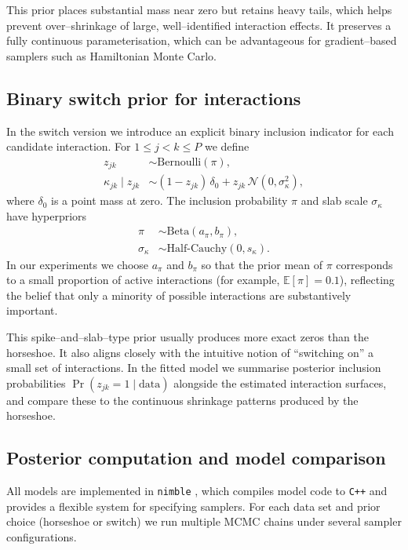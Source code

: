 \documentclass[11pt]{article}
\begin{document}
\begin{doublespacing}
\begin{linenumbers}
\begin{flushleft}
This prior places substantial mass near zero but retains heavy tails, which helps prevent over–shrinkage of large, well–identified interaction effects. It preserves a fully continuous parameterisation, which can be advantageous for gradient–based samplers such as Hamiltonian Monte Carlo.

\subsection{Binary switch prior for interactions}

In the switch version we introduce an explicit binary inclusion indicator for each candidate interaction. For $1 \le j < k \le P$ we define
\begin{align}
  z_{jk} &\sim \mathrm{Bernoulli}(\pi), \\
  \kappa_{jk} \mid z_{jk} &\sim (1-z_{jk})\,\delta_0 + z_{jk}\,\mathcal{N}(0,\sigma_\kappa^2),
\end{align}
where $\delta_0$ is a point mass at zero. The inclusion probability $\pi$ and slab scale $\sigma_\kappa$ have hyperpriors
\begin{align}
  \pi &\sim \mathrm{Beta}(a_\pi,b_\pi), \\
  \sigma_\kappa &\sim \mathrm{Half\text{-}Cauchy}(0,s_\kappa).
\end{align}
In our experiments we choose $a_\pi$ and $b_\pi$ so that the prior mean of $\pi$ corresponds to a small proportion of active interactions (for example, $\mathbb{E}[\pi] = 0.1$), reflecting the belief that only a minority of possible interactions are substantively important.

This spike–and–slab–type prior usually produces more exact zeros than the horseshoe. It also aligns closely with the intuitive notion of ``switching on'' a small set of interactions. In the fitted model we summarise posterior inclusion probabilities $\Pr(z_{jk}=1 \mid \text{data})$ alongside the estimated interaction surfaces, and compare these to the continuous shrinkage patterns produced by the horseshoe.

\subsection{Posterior computation and model comparison}

All models are implemented in \texttt{nimble} \citep{2017_deValpine}, which compiles model code to \texttt{C++} and provides a flexible system for specifying samplers. For each data set and prior choice (horseshoe or switch) we run multiple MCMC chains under several sampler configurations.


\end{flushleft}
\end{linenumbers}
\end{doublespacing}
\end{document}

